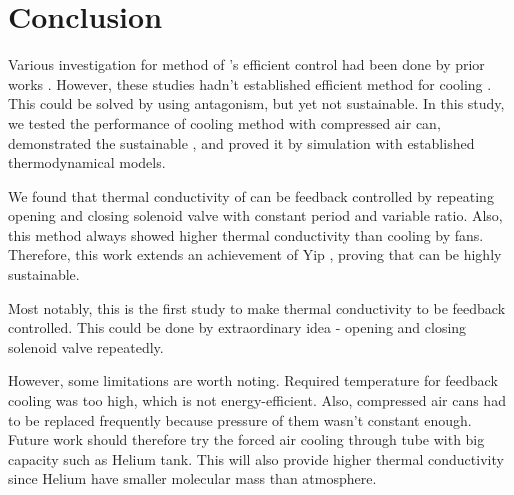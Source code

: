 \section{Conclusion}
Various investigation for method of \scp's efficient control had been done by prior works \cite{haines,mirvakili,yip}. %
However, these studies hadn't established efficient method for cooling \scp. %
This could be solved by using antagonism, but yet not sustainable.
In this study, we tested the performance of cooling method with compressed air can, demonstrated the sustainable \apcnospace, and proved it by simulation with established thermodynamical models. %

We found that thermal conductivity of \scp can be feedback controlled by repeating opening and closing solenoid valve with constant period and variable ratio. %
Also, this method always showed higher thermal conductivity than cooling by fans.
Therefore, this work extends an achievement of Yip \etal, proving that \apc can be highly sustainable.

Most notably, this is the first study to make thermal conductivity to be feedback controlled. This could be done by extraordinary idea - opening and closing solenoid valve repeatedly.


However, some limitations are worth noting. Required temperature for feedback cooling was too high, which is not energy-efficient.
Also, compressed air cans had to be replaced frequently because pressure of them wasn't constant enough. 
Future work should therefore try the forced air cooling through tube with big capacity such as Helium tank. 
This will also provide higher thermal conductivity since Helium have smaller molecular mass than atmosphere.


